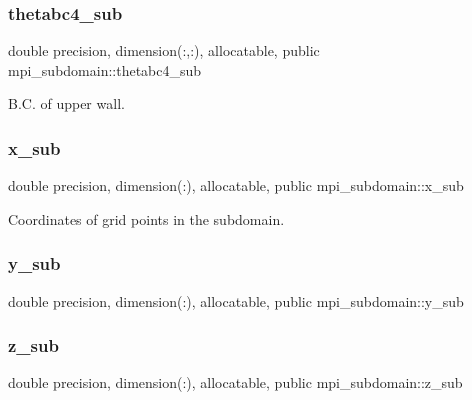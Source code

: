 \subsubsection{\texorpdfstring{thetabc4\+\_\+sub}{thetabc4\_sub}}
{\footnotesize\ttfamily double precision, dimension(\+:,\+:), allocatable, public mpi\+\_\+subdomain\+::thetabc4\+\_\+sub}



B.\+C. of upper wall. 

\mbox{\label{namespacempi__subdomain_a978554e1520c79471ef3793ed1872b37}} 
\subsubsection{\texorpdfstring{x\+\_\+sub}{x\_sub}}
{\footnotesize\ttfamily double precision, dimension(\+:), allocatable, public mpi\+\_\+subdomain\+::x\+\_\+sub}



Coordinates of grid points in the subdomain. 

\mbox{\label{namespacempi__subdomain_a58b09abee5f1002de7b20b1b86f5c821}} 
\subsubsection{\texorpdfstring{y\+\_\+sub}{y\_sub}}
{\footnotesize\ttfamily double precision, dimension(\+:), allocatable, public mpi\+\_\+subdomain\+::y\+\_\+sub}

\mbox{\label{namespacempi__subdomain_aab6d78e49471a9a3db5ad9df4c3d4041}} 
\subsubsection{\texorpdfstring{z\+\_\+sub}{z\_sub}}
{\footnotesize\ttfamily double precision, dimension(\+:), allocatable, public mpi\+\_\+subdomain\+::z\+\_\+sub}

